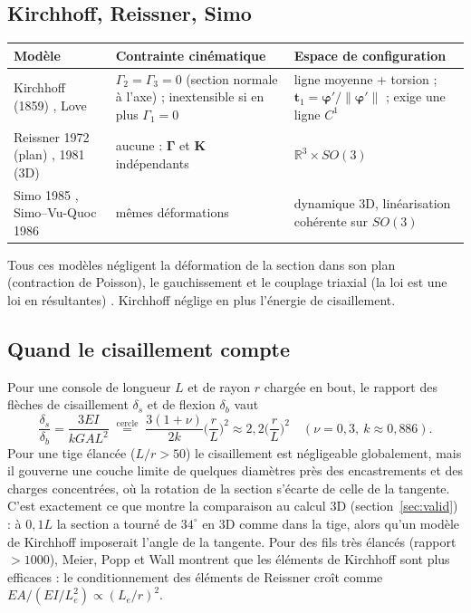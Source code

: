 \documentclass[11pt,a4paper]{article}
\newcommand{\Gam}{\bm{\Gamma}}
\newcommand{\Kv}{\mathbf{K}}
\begin{document}
\subsection{Kirchhoff, Reissner, Simo}
\begin{center}
\small
\begin{tabularx}{\linewidth}{>{\raggedright}p{3.6cm}>{\raggedright}X>{\raggedright\arraybackslash}X}
\toprule
Modèle & Contrainte cinématique & Espace de configuration\\
\midrule
Kirchhoff (1859) \cite{kirchhoff1859}, Love \cite{love1927} &
$\Gamma_2=\Gamma_3=0$ (section normale à l'axe) ; inextensible si en plus $\Gamma_1=0$ &
ligne moyenne + torsion ; $\mathbf t_1=\bm\varphi'/\|\bm\varphi'\|$ ; exige une ligne $C^1$\\
Reissner 1972 (plan) \cite{reissner1972}, 1981 (3D) \cite{reissner1981} &
aucune : $\Gam$ et $\Kv$ indépendants & $\mathbb R^3\times SO(3)$\\
Simo 1985 \cite{simo1985}, Simo--Vu-Quoc 1986 \cite{simovuquoc1986} &
mêmes déformations & dynamique 3D, linéarisation cohérente sur $SO(3)$\\
\bottomrule
\end{tabularx}
\end{center}
Tous ces modèles négligent la déformation de la section dans son plan
(contraction de Poisson), le gauchissement et le couplage triaxial (la loi est une
loi en résultantes) \cite{antman2005}. Kirchhoff néglige en plus l'énergie de
cisaillement.

\subsection{Quand le cisaillement compte}
Pour une console de longueur $L$ et de rayon $r$ chargée en bout, le rapport des
flèches de cisaillement $\delta_s$ et de flexion $\delta_b$ vaut
\begin{equation}
\frac{\delta_s}{\delta_b}=\frac{3EI}{kGAL^2}
\;\overset{\text{cercle}}{=}\;\frac{3(1+\nu)}{2k}\Big(\frac rL\Big)^2\approx 2{,}2\Big(\frac rL\Big)^2
\quad(\nu=0{,}3,\ k\approx0{,}886).
\end{equation}
Pour une tige élancée ($L/r>50$) le cisaillement est négligeable globalement,
mais il gouverne une couche limite de quelques diamètres près des encastrements
et des charges concentrées, où la rotation de la section s'écarte de celle de la
tangente. C'est exactement ce que montre la comparaison au calcul 3D
(section~\ref{sec:valid}) : à $0{,}1L$ la section a tourné de $34^\circ$ en 3D
comme dans la tige, alors qu'un modèle de Kirchhoff imposerait l'angle de la
tangente. Pour des fils très élancés (rapport $>1000$), Meier, Popp et Wall
\cite{meier2019} montrent que les éléments de Kirchhoff sont plus efficaces : le
conditionnement des éléments de Reissner croît comme
$EA/(EI/L_e^2)\propto(L_e/r)^2$.
\end{document}

